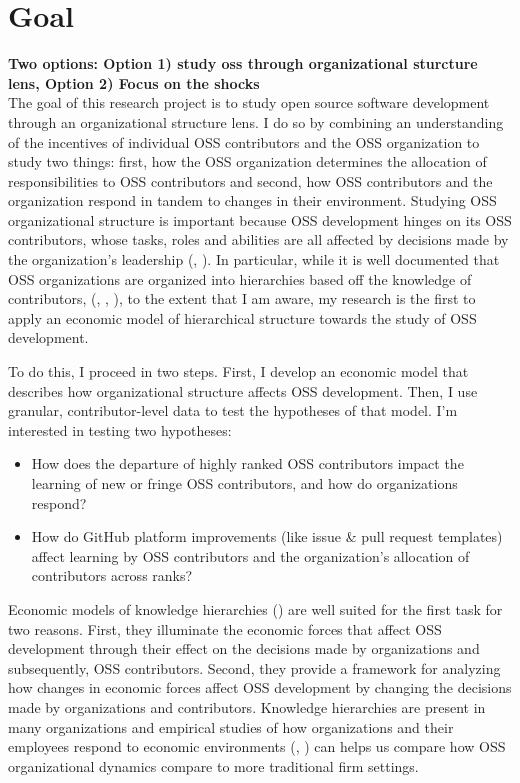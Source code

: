 \documentclass[12pt,notitlepage]{article}
\begin{document}
\section*{Goal}
\textbf{Two options: Option 1) study oss through organizational sturcture lens, Option 2) Focus on the shocks}\\
The goal of this research project is to study open source software development through an organizational structure lens. I do so by combining an understanding of the incentives of individual OSS contributors and the OSS organization to study two things: first, how the OSS organization determines the allocation of responsibilities to OSS contributors and second, how OSS contributors and the organization respond in tandem to changes in their environment. Studying OSS organizational structure is important because OSS development hinges on its OSS contributors, whose tasks, roles and abilities are all affected by decisions made by the organization's leadership (\cite{lerner_simple_2002}, \cite{lerner_economics_2005}). In particular, while it is well documented that OSS organizations are organized into hierarchies based off the knowledge of contributors,  (\cite{crowston_hierarchy_2006}, \cite{crowston_core_2006}, \cite{lerner_simple_2002}), to the extent that I am aware, my research is the first to apply an economic model of hierarchical structure towards the study of OSS development.

To do this, I proceed in two steps. First, I develop an economic model that describes how organizational structure affects OSS development. Then, I use granular, contributor-level data to test the hypotheses of that model. I'm interested in testing two hypotheses:
\begin{itemize}
    \item How does the departure of highly ranked OSS contributors impact the learning of new or fringe OSS contributors, and how do organizations respond?
    \item How do GitHub platform improvements (like issue \& pull request templates) affect learning by OSS contributors and the organization's allocation of contributors across ranks?
\end{itemize}
Economic models of knowledge hierarchies (\cite{garicano_hierarchies_2000}) are well suited for the first task for two reasons. First, they illuminate the economic forces that affect OSS development through their effect on the decisions made by organizations and subsequently, OSS contributors. Second, they provide a framework for analyzing how changes in economic forces affect OSS development by changing the decisions made by organizations and contributors. Knowledge hierarchies are present in many organizations and empirical studies of how organizations and their employees respond to economic environments (\cite{garicano_hierarchies_2012}, \cite{bloom_distinct_2014}) can helps us compare how OSS organizational dynamics compare to more traditional firm settings. \\
\end{document}
